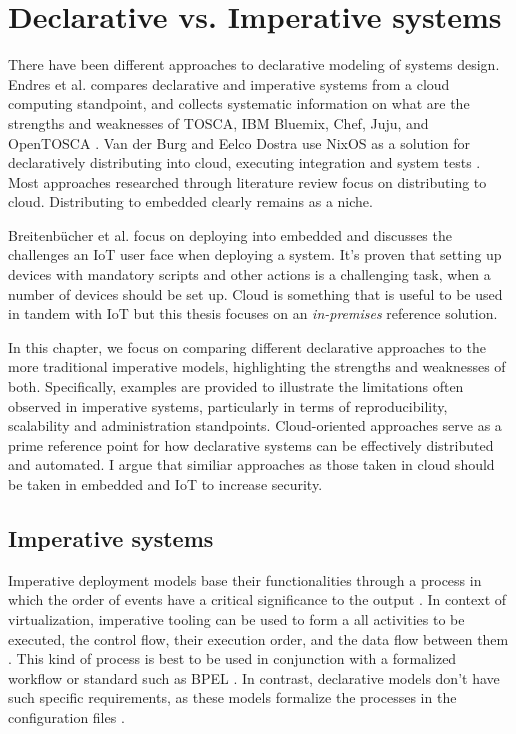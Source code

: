 \chapter{Declarative vs. Imperative systems} \label{imperative}

There have been different approaches to declarative modeling of
systems design. Endres et al. compares declarative and imperative
systems from a cloud computing standpoint, and collects systematic
information on what are the strengths and weaknesses of TOSCA, IBM
Bluemix, Chef, Juju, and OpenTOSCA \cite{endres2017declarative}. Van
der Burg and Eelco Dostra use NixOS as a solution for declaratively
distributing into cloud, executing integration and system tests
\cite{van2010declarative}. Most approaches researched through
literature review focus on distributing to cloud. Distributing to
embedded clearly remains as a niche.

Breitenbücher et al. focus on deploying into embedded and discusses
the challenges an IoT user face when deploying a system. It's proven
that setting up devices with mandatory scripts and other actions is a
challenging task, when a number of devices should be set up. Cloud is
something that is useful to be used in tandem with IoT but this thesis
focuses on an \textit{in-premises} reference
solution. \cite{breitenbucher2017declarative}

In this chapter, we focus on comparing different declarative
approaches to the more traditional imperative models, highlighting the
strengths and weaknesses of both. Specifically, examples are provided
to illustrate the limitations often observed in imperative systems,
particularly in terms of reproducibility, scalability and
administration standpoints. Cloud-oriented approaches serve as a prime
reference point for how declarative systems can be effectively
distributed and automated. I argue that similiar approaches as those
taken in cloud should be taken in embedded and IoT to increase security.

\section{Imperative systems}

Imperative deployment models base their functionalities through a
process in which the order of events have a critical significance to
the output \cite{breitenbucher2017declarative}. In context of
virtualization, imperative tooling can be used to form a all
activities to be executed, the control flow, their execution order,
and the data flow between them \cite{endres2017declarative}. This kind
of process is best to be used in conjunction with a formalized
workflow or standard such as BPEL \cite{endres2017declarative}. In
contrast, declarative models don't have such specific requirements, as
these models formalize the processes in the configuration files
\cite{endres2017declarative}.

